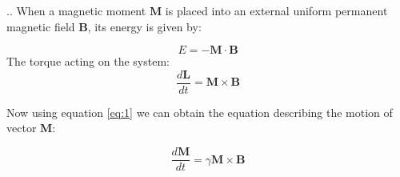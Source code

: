 \documentclass{beamer}
\begin{document}
\begin{frame}{\thesection.\thesubsection. \insertsubsection}
 When a magnetic moment $\bm{M}$ is placed into an external uniform permanent magnetic field $\bm{B}$, its energy is given by:
			
			\begin{equation} \label{eq:classic_energy}
			E = -\bm{M} \cdot \bm{B}
			\end{equation} 
	\onslide<2->  The torque acting on the system:
			\begin{equation}
			\frac{d\bm{L}}{dt} = \bm{M} \times \bm{B}
			\end{equation}
			  
		Now using equation \ref{eq:1} we can obtain the equation describing the motion of vector $\bm{M}$:
			
			\begin{equation} \label{eq:precession_compact}
			\frac{d\bm{M}}{dt} = \gamma \bm{M} \times \bm{B}
			\end{equation}
			

\end{frame}
\end{document}
